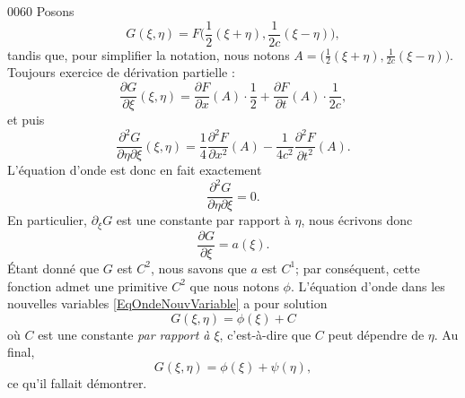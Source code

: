 \begin{corrige}{0060}
Posons
\begin{equation}
	G(\xi,\eta)=F\big(\frac{ 1 }{2}(\xi+\eta),\frac{1}{ 2c }(\xi-\eta) \big),
\end{equation}
tandis que, pour simplifier la notation, nous notons $A=\big( \frac{ 1 }{2}(\xi+\eta),\frac{1}{ 2c }(\xi-\eta)\big)$. Toujours exercice de dérivation partielle :
\begin{equation}
	\frac{ \partial G }{ \partial \xi }(\xi,\eta)=\frac{ \partial F }{ \partial x }(A)\cdot\frac{ 1 }{2}+\frac{ \partial F }{ \partial t }(A)\cdot\frac{1}{ 2c },
\end{equation}
et puis
\begin{equation}
	\frac{ \partial^2G  }{ \partial\eta\partial\xi }(\xi,\eta)=\frac{1}{ 4 }\frac{ \partial^2F  }{ \partial x^2 }(A)-\frac{1}{ 4c^2 }\frac{ \partial^2F  }{ \partial t^2 }(A).
\end{equation}
L'équation d'onde est donc en fait exactement
\begin{equation}		\label{EqOndeNouvVariable}
	\frac{ \partial^2G  }{ \partial \eta\partial\xi }=0.
\end{equation}
En particulier, $\partial_{\xi}G$ est une constante par rapport à $\eta$, nous écrivons donc 
\begin{equation}
	\frac{ \partial G }{ \partial \xi }=a(\xi).
\end{equation}
Étant donné que $G$ est $C^2$, nous savons que $a$ est $C^1$; par conséquent, cette fonction admet une primitive $C^2$ que nous notons $\phi$. L'équation  d'onde dans les nouvelles variables \eqref{EqOndeNouvVariable} a pour solution
\begin{equation}
	G(\xi,\eta)=\phi(\xi)+C
\end{equation}
où $C$ est une constante \emph{par rapport à $\xi$}, c'est-à-dire que $C$ peut dépendre de $\eta$. Au final,
\begin{equation}
		G(\xi,\eta)=\phi(\xi)+\psi(\eta),
\end{equation}
ce qu'il fallait démontrer.


\end{corrige}
